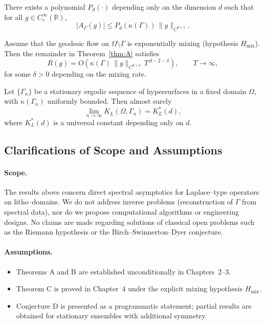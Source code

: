 \begin{theoremB}\label{thm:B}
There exists a polynomial $P_d(\cdot)$ depending only on the dimension $d$ 
such that for all $g \in C_c^\infty(\mathbb{R})$,
\[
|A_\Gamma(g)| \le P_d(\kappa(\Gamma)) \, \|g\|_{C^{d+1}}.
\]
\end{theoremB}

\begin{theoremC}\label{thm:C}
Assume that the geodesic flow on $\Omega \setminus \Gamma$ 
is exponentially mixing (hypothesis $H_{\mathrm{mix}}$). 
Then the remainder in Theorem~\ref{thm:A} satisfies
\[
R(g) = O\!\left( \kappa(\Gamma)\, \|g\|_{C^{d+3}}\, T^{\,d-2-\delta} \right),
\qquad T \to \infty,
\]
for some $\delta>0$ depending on the mixing rate.
\end{theoremC}

\begin{conjectureD}\label{conj:D}
Let $\{\Gamma_n\}$ be a stationary ergodic sequence of hypersurfaces 
in a fixed domain $\Omega$, with $\kappa(\Gamma_n)$ uniformly bounded. 
Then almost surely
\[
\lim_{n\to\infty} K_L(\Omega,\Gamma_n) = K_L^*(d),
\]
where $K_L^*(d)$ is a universal constant depending only on $d$.
\end{conjectureD}

\subsection{Clarifications of Scope and Assumptions}

\paragraph{Scope.}
The results above concern direct spectral asymptotics for Laplace--type operators 
on litho--domains. 
We do not address inverse problems (reconstruction of $\Gamma$ from spectral data), 
nor do we propose computational algorithms or engineering designs. 
No claims are made regarding solutions of classical open problems 
such as the Riemann hypothesis or the Birch--Swinnerton--Dyer conjecture.

\paragraph{Assumptions.}
\begin{itemize}
\item Theorems A and B are established unconditionally in Chapters~2--3. 
\item Theorem C is proved in Chapter~4 under the explicit mixing hypothesis 
$H_{\mathrm{mix}}$.
\item Conjecture D is presented as a programmatic statement; 
partial results are obtained for stationary ensembles with additional symmetry. 
\end{itemize}

